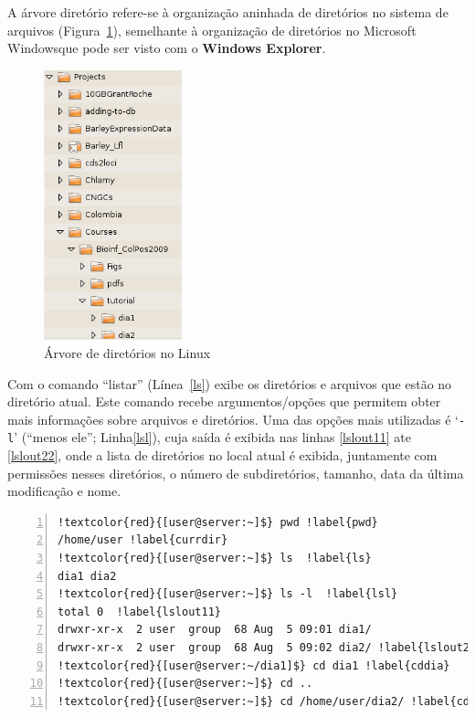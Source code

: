 \documentclass[letter,11pt]{book}
\begin{document}
A árvore diretório refere-se à organização aninhada de diretórios no sistema de arquivos (Figura~\ref{arboldir}), semelhante à organização de diretórios no Microsoft Windows\texttrademark que pode ser visto com o \textbf{Windows Explorer}.

\begin{figure}[ht]
\centering
   \includegraphics[width=4cm]{Figs/arboldir.png}
  \caption{\label{arboldir}Árvore de diretórios no Linux}
\end{figure}

Com o comando ``listar'' (Línea~\ref{ls}) exibe os diretórios e arquivos que estão no diretório atual. Este comando recebe argumentos/opções que permitem obter mais informações sobre arquivos e diretórios. Uma das opções mais utilizadas é `\Verb+-l+' (``menos ele''; Linha\ref{lsl}), cuja saída é exibida nas linhas \ref{lslout11} ate \ref{lslout22}, onde a lista de diretórios no local atual é exibida, juntamente com permissões nesses diretórios, o número de subdiretórios, tamanho, data da última modificação e nome.

\begin{Verbatim}[commandchars=!\{\},numbers=left,firstnumber=last,label=Navegando pela árvore de diretórios,frame=topline,fontsize=\scriptsize]
!textcolor{red}{[user@server:~]$} pwd !label{pwd}
/home/user !label{currdir}
!textcolor{red}{[user@server:~]$} ls  !label{ls}
dia1 dia2
!textcolor{red}{[user@server:~]$} ls -l  !label{lsl}
total 0  !label{lslout11}
drwxr-xr-x  2 user  group  68 Aug  5 09:01 dia1/
drwxr-xr-x  2 user  group  68 Aug  5 09:02 dia2/ !label{lslout22}
!textcolor{red}{[user@server:~/dia1]$} cd dia1 !label{cddia}
!textcolor{red}{[user@server:~]$} cd ..
!textcolor{red}{[user@server:~]$} cd /home/user/dia2/ !label{cdabsolutepath}
\end{Verbatim} 
\end{document}
